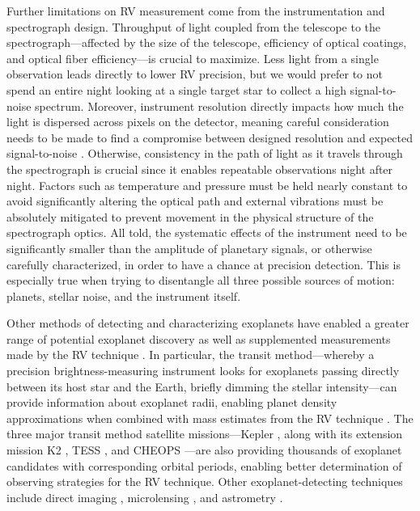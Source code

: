 Further limitations on RV measurement come from the instrumentation and spectrograph design. Throughput of light coupled from the telescope to the spectrograph---affected by the size of the telescope, efficiency of optical coatings, and optical fiber efficiency---is crucial to maximize. Less light from a single observation leads directly to lower RV precision, but we would prefer to not spend an entire night looking at a single target star to collect a high signal-to-noise spectrum. Moreover, instrument resolution directly impacts how much the light is dispersed across pixels on the detector, meaning careful consideration needs to be made to find a compromise between designed resolution and expected signal-to-noise \citep{davis_insights_2017}. Otherwise, consistency in the path of light as it travels through the spectrograph is crucial since it enables repeatable observations night after night. Factors such as temperature and pressure must be held nearly constant to avoid significantly altering the optical path and external vibrations must be absolutely mitigated to prevent movement in the physical structure of the spectrograph optics. All told, the systematic effects of the instrument need to be significantly smaller than the amplitude of planetary signals, or otherwise carefully characterized, in order to have a chance at precision detection. This is especially true when trying to disentangle all three possible sources of motion: planets, stellar noise, and the instrument itself.

Other methods of detecting and characterizing exoplanets have enabled a greater range of potential exoplanet discovery as well as supplemented measurements made by the RV technique \citep{fischer_exoplanet_2014}. In particular, the transit method---whereby a precision brightness-measuring instrument looks for exoplanets passing directly between its host star and the Earth, briefly dimming the stellar intensity---can provide information about exoplanet radii, enabling planet density approximations when combined with mass estimates from the RV technique \citep{deeg_transit_2018}. The three major transit method satellite missions---Kepler \citep{borucki_kepler_2010}, along with its extension mission K2 \citep{howell_k2_2014}, TESS \citep{ricker_transiting_2014}, and CHEOPS \citep{benz_cheops_2020}---are also providing thousands of exoplanet candidates with corresponding orbital periods, enabling better determination of observing strategies for the RV technique. Other exoplanet-detecting techniques include direct imaging \citep[measuring emitted light from an exoplanet after blocking light from the star with a coronagraph;][]{lagrange_direct_2014}, microlensing \citep[measuring the general relativistic bending of light due to the gravity of an exoplanet;][]{gaudi_microlensing_2012}, and astrometry \citep[measuring non-radial stellar positions over time;][]{perryman_history_2012}.

